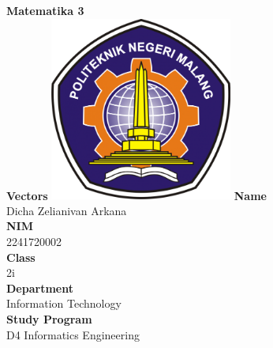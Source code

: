 \documentclass[12pt,titlepage]{article}
\newcommand{\vSubject}{Matematika 3}
\newcommand{\vSubtitle}{Vectors}
\newcommand{\vName}{Dicha Zelianivan Arkana}
\newcommand{\vNIM}{2241720002}
\newcommand{\vClass}{2i}
\newcommand{\vDepartment}{Information Technology}
\newcommand{\vStudyProgram}{D4 Informatics Engineering}
\begin{document}
\begin{titlepage}
    \centering
    \vfill
    {\bfseries\LARGE
        \vSubject\\
        \vskip0.25cm
        \vSubtitle
    }
    \vfill
    \includegraphics[width=6cm]{images/polinema-logo.png}
    \vfill
    {
        \textbf{Name}\\
        \vName\\
        \vskip0.5cm
        \textbf{NIM}\\
        \vNIM\\
        \vskip0.5cm
        \textbf{Class}\\
        \vClass\\
        \vskip0.5cm
        \textbf{Department}\\
        \vDepartment\\
        \vskip0.5cm
        \textbf{Study Program}\\
        \vStudyProgram
    }
\end{titlepage}
\end{document}
